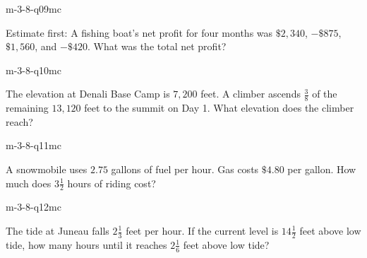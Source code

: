 \begin{practiceQuestion}{m-3-8-q09}{mc}
\begin{questionText}
Estimate first: A fishing boat's net profit for four months was $\$2{,}340$, $-\$875$, $\$1{,}560$, and $-\$420$. What was the total net profit?
\end{questionText}
\end{practiceQuestion}

\begin{practiceQuestion}{m-3-8-q10}{mc}
\begin{questionText}
The elevation at Denali Base Camp is $7{,}200$ feet. A climber ascends $\frac{3}{8}$ of the remaining $13{,}120$ feet to the summit on Day 1. What elevation does the climber reach?
\end{questionText}
\end{practiceQuestion}

\begin{practiceQuestion}{m-3-8-q11}{mc}
\begin{questionText}
A snowmobile uses $2.75$ gallons of fuel per hour. Gas costs $\$4.80$ per gallon. How much does $3\frac{1}{2}$ hours of riding cost?
\end{questionText}
\end{practiceQuestion}

\begin{practiceQuestion}{m-3-8-q12}{mc}
\begin{questionText}
The tide at Juneau falls $2\frac{1}{3}$ feet per hour. If the current level is $14\frac{1}{2}$ feet above low tide, how many hours until it reaches $2\frac{1}{6}$ feet above low tide?
\end{questionText}
\end{practiceQuestion}

